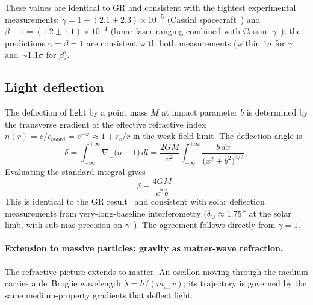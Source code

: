 \documentclass[aps,prd,onecolumn,superscriptaddress,nofootinbib,showpacs,12pt]{revtex4-2}
\newcommand{\rs}{r_{\mathrm{s}}}
\begin{document}
These values are identical to GR and consistent with the
tightest experimental measurements:
$\gamma = 1 + (2.1 \pm 2.3) \times 10^{-5}$
(Cassini spacecraft~\cite{Bertotti2003}) and
$\beta - 1 = (1.2 \pm 1.1) \times 10^{-4}$
(lunar laser ranging combined with Cassini
$\gamma$~\cite{Williams2004}); the predictions
$\gamma = \beta = 1$ are consistent with both
measurements (within $1\sigma$ for $\gamma$ and
$\sim\!1.1\sigma$ for $\beta$).

\subsection{Light deflection}\label{sec:deflection}

The deflection of light by a point mass $M$ at impact
parameter $b$ is determined by the transverse gradient
of the effective refractive index
$n(r) = c/c_{\mathrm{coord}} = e^{-\varphi}
\approx 1 + \rs/r$ in the weak-field limit.
The deflection angle is
\begin{equation}\label{eq:deflection_integral}
  \delta = \int_{-\infty}^{+\infty}
    \nabla_{\!\perp}\!\bigl(n - 1\bigr)\,dl
  = \frac{2GM}{c^{2}}\int_{-\infty}^{+\infty}
    \frac{b\,dx}{\bigl(x^{2}+b^{2}\bigr)^{3/2}}\,.
\end{equation}
Evaluating the standard integral gives
\begin{equation}\label{eq:deflection}
  \delta = \frac{4GM}{c^{2}\,b}\,.
\end{equation}
This is identical to the GR result~\cite{Einstein1915}
and consistent with solar deflection measurements from
very-long-baseline interferometry ($\delta_{\odot} \approx
1.75''$ at the solar limb, with sub-mas precision on
$\gamma$~\cite{Will2014}).  The agreement follows directly
from $\gamma = 1$.

\paragraph{Extension to massive particles: gravity as
matter-wave refraction.}
The refractive picture extends to matter.  An oscillon
moving through the medium carries a de~Broglie wavelength
$\lambda = h/(m_{\mathrm{eff}}\,v)$; its trajectory is
governed by the same medium-property gradients that deflect
light.
\end{document}
